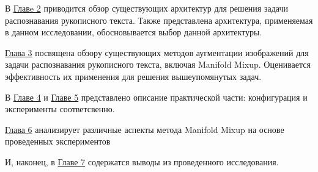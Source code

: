 В \hyperref[sec:Chapter1]{Главe 2} приводится обзор существующих архитектур для решения задачи распознавания рукописного текста. Также представлена архитектура, применяемая в данном исследовании, обосновывается выбор данной архитектуры.


\hyperref[sec:Chapter2]{Глава 3} посвящена обзору существующих методов аугментации изображений для задачи распознавания рукописного текста, включая Manifold Mixup. Оценивается эффективность их применения для решения вышеупомянутых задач.

В \hyperref[sec:Chapter3]{Главе 4} и \hyperref[sec:Chapter4]{Главе 5} представлено описание практической части: конфигурация и эксперименты соответсвенно.

\hyperref[sec:Chapter5]{Глава 6}  анализирует различные аспекты метода Manifold Mixup на основе проведенных экспериментов

И, наконец, в \hyperref[sec:Chapter6]{Главе 7} содержатся выводы из проведенного исследования.

\newpage